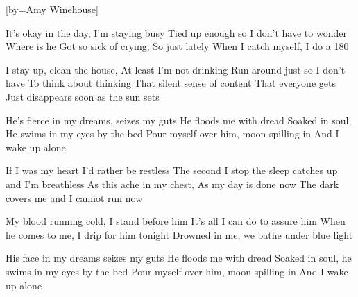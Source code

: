 [by={Amy Winehouse}]
  

  \beginverse
  It's okay in the day,
  I'm staying busy
  Tied up enough so I don't have to wonder
  Where is he
  Got so sick of crying,
  So just lately
  When I catch myself, I do a 180
  \endverse
  
  \beginverse              
  I stay up, clean the house,
  At least I'm not drinking
  Run around just so I don't have
  To think about thinking
  That silent sense of content
  That everyone gets
  Just disappears soon as the sun sets
  \endverse
  
  \beginchorus
  He's fierce in my dreams, seizes my guts
  He floods me with dread
  Soaked in soul,
  He swims in my eyes by the bed
  Pour myself  over him, moon spilling in
  And I wake up alone
  \endchorus
  
  \beginverse  
  If I was my heart
  I'd rather be restless
  The second I stop the sleep catches up
  and I'm breathless
  As this ache in my chest,
  As my day is done now
  The dark covers me and I cannot run now
  \endverse
  
  \beginverse  
  My blood running cold, I stand before him
  It's all I can do to assure him
  When he comes to me, I drip for him tonight
  Drowned in me, we bathe under blue light
  \endverse
  
  \beginchorus
  His face in my dreams seizes my guts
  He floods me with dread
  Soaked in soul, he swims in my eyes by the bed
  Pour myself over him, moon spilling in
  And I wake up alone 
  \endchorus
\endsong

